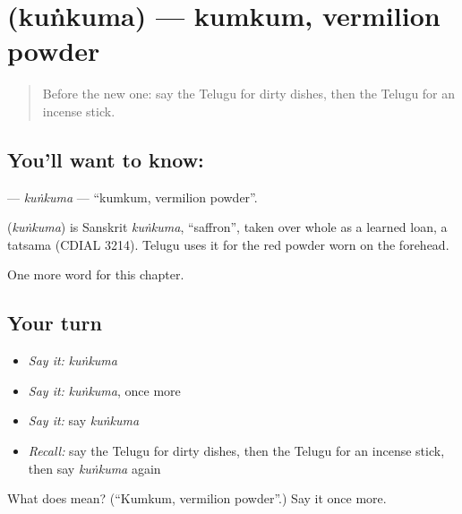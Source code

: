 \section[\texorpdfstring{\te{కుంకుమ} (kuṅkuma)}{కుంకుమ (kuṅkuma)}]{ (kuṅkuma) — kumkum, vermilion powder}

\label{lesson:TE-C307-kunkuma}



\begin{quote}
Before the new one: say the Telugu for dirty dishes, then the Telugu for an incense stick.
\end{quote}

\subsection*{You'll want to know: }
\textbf{} — \emph{kuṅkuma} — \textquotedblleft{}kumkum, vermilion powder\textquotedblright{}.

\begin{cousinweb}
\textbf{} (\emph{kuṅkuma}) is Sanskrit \emph{kuṅkuma}, \textquotedblleft{}saffron\textquotedblright{}, taken over whole as a learned loan, a tatsama (CDIAL 3214). Telugu uses it for the red powder worn on the forehead.
\end{cousinweb}

\begin{grammarlens}[title={What you've built}]
One more word for this chapter.
\end{grammarlens}

\subsection*{Your turn}
\begin{itemize}
\raggedright
  \item \emph{Say it:} \emph{kuṅkuma}
  \item \emph{Say it:} \emph{kuṅkuma}, once more
  \item \emph{Say it:} say \emph{kuṅkuma}
  \item \emph{Recall:} say the Telugu for dirty dishes, then the Telugu for an incense stick, then say \emph{kuṅkuma} again
\end{itemize}

\begin{tcolorbox}[breakable,colback=teal!4,colframe=teal!35!black,title={Before you move on}]
What does  mean? (\textquotedblleft{}Kumkum, vermilion powder\textquotedblright{}.) Say it once more.
\end{tcolorbox}
